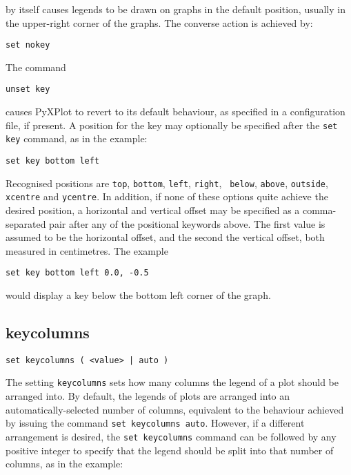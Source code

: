 \noindent by itself causes legends to be drawn on graphs in the default
position, usually in the upper-right corner of the graphs. The converse action
is achieved by:

\begin{verbatim}
set nokey
\end{verbatim}

\noindent The command

\begin{verbatim}
unset key
\end{verbatim}

\noindent causes PyXPlot to revert to its default behaviour, as specified in a
configuration file, if present. A position for the key may optionally be
specified after the {\tt set key} command, as in the example:

\begin{verbatim}
set key bottom left
\end{verbatim}

Recognised positions are {\tt top}, {\tt bottom}, {\tt left}, {\tt right}, {\tt
below}, {\tt above}, {\tt outside}, {\tt xcentre} and {\tt ycentre}. In
addition, if none of these options quite achieve the desired position, a
horizontal and vertical offset may be specified as a comma-separated pair after
any of the positional keywords above.  The first value is assumed to be the
horizontal offset, and the second the vertical offset, both measured in
centimetres.  The example

\begin{verbatim}
set key bottom left 0.0, -0.5
\end{verbatim}

\noindent would display a key below the bottom left corner of the graph.


\subsection{keycolumns}

\begin{verbatim}
set keycolumns ( <value> | auto )
\end{verbatim}

The setting {\tt keycolumns} sets how many columns the legend of a plot should
be arranged into. By default, the legends of plots are arranged into an
automatically-selected number of columns, equivalent to the behaviour achieved
by issuing the command {\tt set key\-columns auto}. However, if a different
arrangement is desired, the {\tt set keycolumns} command can be followed by any
positive integer to specify that the legend should be split into that number of
columns, as in the example:


